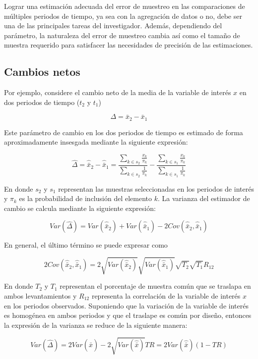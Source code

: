 \documentclass[12pt,spanish,]{book}
\begin{document}
Lograr una estimación adecuada del error de muestreo en las comparaciones de múltiples periodos de tiempo, ya sea con la agregación de datos o no, debe ser una de las principales tareas del investigador. Además, dependiendo del parámetro, la naturaleza del error de muestreo cambia así como el tamaño de muestra requerido para satisfacer las necesidades de precisión de las estimaciones.

\hypertarget{cambios-netos}{%
\subsection*{Cambios netos}\label{cambios-netos}}

Por ejemplo, considere el cambio neto de la media de la variable de interés \(x\) en dos periodos de tiempo (\(t_2\) y \(t_1\))

\[
\Delta = \bar{x}_2 - \bar{x}_1
\]

Este parámetro de cambio en los dos periodos de tiempo es estimado de forma aproximadamente insesgada mediante la siguiente expresión:

\[
\hat{\Delta} = \hat{\bar{x}}_2 - \hat{\bar{x}}_1
= \frac{\sum_{k\in s_2}\frac{x_{k}}{\pi_k}}{\sum_{k\in s_2}\frac{1}{\pi_k}} - \frac{\sum_{k\in s_1}\frac{x_{k}}{\pi_k}}{\sum_{k\in s_1}\frac{1}{\pi_k}} 
\]

En donde \(s_2\) y \(s_1\) representan las muestras seleccionadas en los periodos de interés y \(\pi_k\) es la probabilidad de inclusión del elemento \(k\). La varianza del estimador de cambio se calcula mediante la siguiente expresión:

\[
Var(\hat{\Delta}) = Var(\hat{\bar{x}}_2) + Var(\hat{\bar{x}}_1) - 2Cov(\hat{\bar{x}}_2, \hat{\bar{x}}_1)
\]

En general, el último término se puede expresar como

\[
2Cov(\hat{\bar{x}}_2, \hat{\bar{x}}_1) = 
2\sqrt{Var(\hat{\bar{x}}_2)}\sqrt{Var(\hat{\bar{x}}_1)}\sqrt{T_2}\sqrt{T_1}R_{12}
\]

En donde \(T_2\) y \(T_1\) representan el porcentaje de muestra común que se traslapa en ambos levantamientos y \(R_{12}\) representa la correlación de la variable de interés \(x\) en los periodos observados. Suponiendo que la variación de la variable de interés es homogénea en ambos periodos y que el traslape es común por diseño, entonces la expresión de la varianza se reduce de la siguiente manera:

\[
Var(\hat{\Delta}) = 2Var(\hat{\bar{x}}) - 2\sqrt{Var(\hat{\bar{x}})}TR
=2Var(\hat{\bar{x}})(1-TR) 
\]
\end{document}
